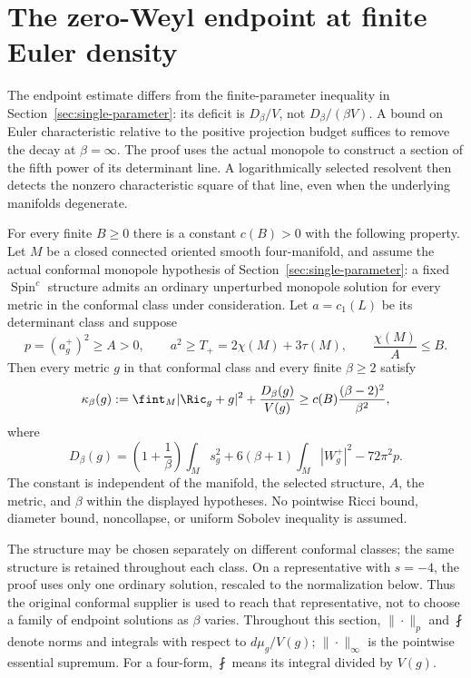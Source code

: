 \section{The zero-Weyl endpoint at finite Euler density}
\label{sec:finite-density-endpoint}

The endpoint estimate differs from the finite-parameter inequality in
Section~\ref{sec:single-parameter}: its deficit is $D_\beta/V$, not
$D_\beta/(\beta V)$.  A bound on Euler characteristic relative to the
positive projection budget suffices to remove the decay at
$\beta=\infty$.  The proof uses the actual monopole to construct a
section of the fifth power of its determinant line.  A logarithmically
selected resolvent then detects the nonzero characteristic square of
that line, even when the underlying manifolds degenerate.

\begin{theorem}
\label{thm:finite-density-endpoint}
For every finite $B\ge0$ there is a constant $c(B)>0$ with the following
property.  Let $M$ be a closed connected oriented smooth four-manifold,
and assume the actual conformal monopole hypothesis of
Section~\ref{sec:single-parameter}: a fixed
$\operatorname{Spin}^c$ structure admits an ordinary unperturbed
monopole solution for every metric in the conformal class under
consideration.  Let $a=c_1(L)$ be its determinant class and suppose
\[
 p=(a_g^+)^2\ge A>0,\qquad a^2\ge T_+=2\chi(M)+3\tau(M),
 \qquad \frac{\chi(M)}{A}\le B.
\]
Then every metric $g$ in that conformal class and every finite
$\beta\ge2$ satisfy
\begin{equation}
 \kappa_\beta(g):=
 \fint_M|\Ric_g+g|^2+\frac{D_\beta(g)}{V(g)}
 \ge c(B)\frac{(\beta-2)^2}{\beta^2},
 \label{eq:finite-density-gap}
\end{equation}
where
\[
 D_\beta(g)=\left(1+\frac1\beta\right)\int_Ms_g^2
       +6(\beta+1)\int_M|W_g^+|^2-72\pi^2p.
\]
The constant is independent of the manifold, the selected structure,
$A$, the metric, and $\beta$ within the displayed hypotheses.  No
pointwise Ricci bound, diameter bound, noncollapse, or uniform Sobolev
inequality is assumed.
\end{theorem}

The structure may be chosen separately on different conformal classes;
the same structure is retained throughout each class.  On a
representative with $s=-4$, the proof uses only one ordinary solution,
rescaled to the normalization below.  Thus the original conformal
supplier is used to reach that representative, not to choose a family
of endpoint solutions as $\beta$ varies.  Throughout this section,
$\|\cdot\|_p$ and $\fint$ denote norms and integrals with respect to
$d\mu_g/V(g)$; $\|\cdot\|_\infty$ is the pointwise essential supremum.
For a four-form, $\fint$ means its integral divided by $V(g)$.

